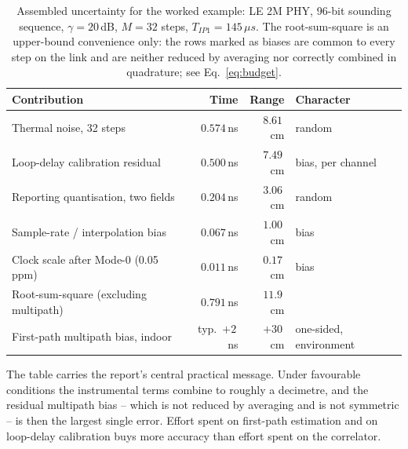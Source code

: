 \documentclass[11pt,a4paper]{article}
\newcommand{\us}{\,\ensuremath{\upmu}s}
\newcommand{\Tip}{T_{IP1}}
\providecommand{\upmu}{\mu}
\begin{document}
\begin{table}[h]
\caption{Assembled uncertainty for the worked example: LE 2M PHY, 96-bit sounding sequence,
$\gamma = 20$\,dB, $M = 32$ steps, $\Tip = 145\us$. The root-sum-square is an upper-bound
convenience only: the rows marked as biases are common to every step on the link and are neither
reduced by averaging nor correctly combined in quadrature; see Eq.~\eqref{eq:budget}.}
\label{tab:example}
\centering\small
\begin{tabular}{@{}L{54mm}rrl@{}}
\toprule
Contribution & Time & Range & Character \\
\midrule
Thermal noise, 32 steps        & $0.574$\,ns & $8.61$\,cm & random \\
Loop-delay calibration residual& $0.500$\,ns & $7.49$\,cm & bias, per channel \\
Reporting quantisation, two fields & $0.204$\,ns & $3.06$\,cm & random \\
Sample-rate / interpolation bias& $0.067$\,ns & $1.00$\,cm & bias \\
Clock scale after Mode-0 (0.05\,ppm) & $0.011$\,ns & $0.17$\,cm & bias \\
\midrule
Root-sum-square (excluding multipath) & $0.791$\,ns & $11.9$\,cm & \\
\midrule
First-path multipath bias, indoor & typ.\ $+2$\,ns & $+30$\,cm & one-sided, environment \\
\bottomrule
\end{tabular}
\end{table}

The table carries the report's central practical message. Under favourable conditions the
instrumental terms combine to roughly a decimetre, and the residual multipath bias -- which is not
reduced by averaging and is not symmetric -- is then the largest single error. Effort spent on
first-path estimation and on loop-delay calibration buys more accuracy than effort spent on the
correlator.
\end{document}
